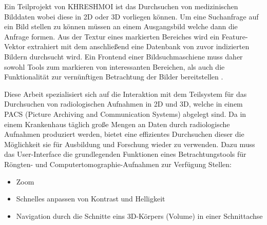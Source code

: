 Ein Teilprojekt von KHRESHMOI ist das Durchsuchen von medizinischen Bilddaten wobei diese in 2D oder 3D vorliegen können.
Um eine Suchanfrage auf ein Bild stellen zu können müssen an einem Ausgangsbild  welche dann die Anfrage formen.
Aus der Textur eines markierten Bereiches wird ein Feature-Vektor extrahiert mit dem anschließend eine Datenbank von zuvor indizierten Bildern durchsucht wird.
%
Ein Frontend einer Bildsuchmaschiene muss daher sowohl Tools zum markieren von interessanten Bereichen, 
als auch die Funktionalität zur vernünftigen Betrachtung der Bilder bereitstellen \cite{kres}.

Diese Arbeit spezialisiert sich auf die Interaktion mit dem Teilsystem für das Durchsuchen von radiologischen Aufnahmen in 2D und 3D,
welche in einem PACS (Picture Archiving and Communication Systems) abgelegt sind.
Da in einem Krankenhaus täglich große Mengen an Daten durch radiologische Aufnahmen produziert werden, 
bietet eine effizientes Durchsuchen dieser die Möglichkeit  sie für Ausbildung und Forschung wieder zu verwenden.
%
Dazu muss das User-Interface die grundlegenden Funktionen eines Betrachtungstools für Röngten- und Computertomographie-Aufnahmen zur Verfügung Stellen:
\begin{itemize}
	\item Zoom
	\item Schnelles anpassen von Kontrast und Helligkeit
	\item Navigation durch die Schnitte eins 3D-Körpers (Volume) in einer Schnittachse
\end{itemize}
\cite{pacs}

